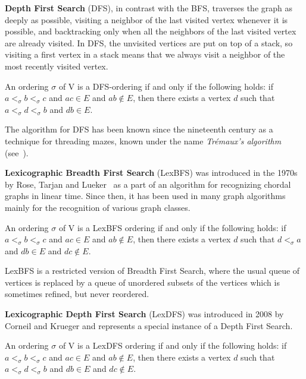\documentclass{svproc}
\begin{document}
\vspace{2.5mm}\noindent\textbf{Depth First Search} (DFS), in contrast with the BFS, traverses the graph as deeply as possible, visiting a neighbor of the last visited vertex whenever it is possible, and backtracking only when all the neighbors of the last visited vertex are already visited. In DFS, the unvisited vertices are put on top of a stack, so visiting a first vertex in a stack means that we always visit a neighbor of the most recently visited vertex. 
\begin{definition}
\label{thm:dfs-ordering-characterization}
An ordering $\sigma$ of V is a DFS-ordering if and only if the following holds: if $ a <_\sigma b <_\sigma c$ and $ac \in E$ and $ab \notin E$, then there exists a vertex $d$ such that $a<_\sigma d <_\sigma b$ and $db \in E$. 
\end{definition}
The algorithm for DFS has been known since the nineteenth century as a technique for threading mazes, known under the name \emph{Tr\' emaux's algorithm} (see~\cite{lucas1882recreations}).

\vspace{2.5mm}\noindent\textbf{Lexicographic Breadth First Search} (LexBFS) was introduced in the 1970s by Rose, Tarjan and Lueker~\cite{rose1976} as a part of an algorithm for recognizing chordal graphs in linear time.
Since then, it has been used in many graph algorithms mainly for the recognition of various graph classes. 
\begin{definition}
\label{thm:lbfs-ordering-characterization}
An ordering $\sigma$ of V is a LexBFS ordering if and only if the following holds: if $ a <_\sigma b <_\sigma c$ and $ac \in E$ and $ab \notin E$, then there exists a vertex $d$ such that $d<_\sigma a$ and $db \in E$ and $dc\notin E$. 
\end{definition}
LexBFS is a restricted version of Breadth First Search, where the usual queue of vertices is replaced by a queue of unordered subsets of the vertices which is sometimes refined, but never reordered. 

\vspace{2.5mm}\noindent\textbf{Lexicographic Depth First Search} (LexDFS) was introduced in 2008 by Corneil and Krueger \cite{corneil2008unified} and represents a special instance of a Depth First Search. 
\begin{definition}
\label{thm:ldfs-ordering-characterization}
An ordering $\sigma$ of V is a LexDFS ordering if and only if the following holds: if $ a <_\sigma b <_\sigma c$ and $ac \in E$ and $ab \notin E$, then there exists a vertex $d$ such that $a<_\sigma d <_\sigma b$ and $db \in E$ and $dc\notin E$. 
\end{definition}
\end{document}
